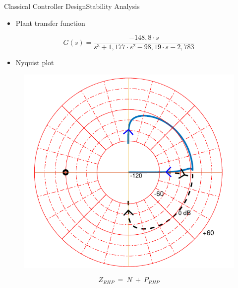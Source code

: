 \begin{frame}{Classical Controller Design}{Stability Analysis}	 
\begin{itemize}
	\item Plant transfer function
\end{itemize}
\begin{displaymath}
\si{G(s) = \frac{-148,8 \cdot s}{s^3 + 1,177 \cdot s^2 - 98,19 \cdot s - 2,783}}
\end{displaymath}
\pause	
\begin{itemize}
	\item Nyquist plot
\end{itemize}
\begin{figure}
	\includegraphics[scale=.45]{Pictures/nyquistCubli}
	\centering
\end{figure}	
\begin{displaymath}
	\si{Z_{RHP}\ =\ N\ +\ P_{RHP}} \nonumber
\end{displaymath}
\end{frame}

